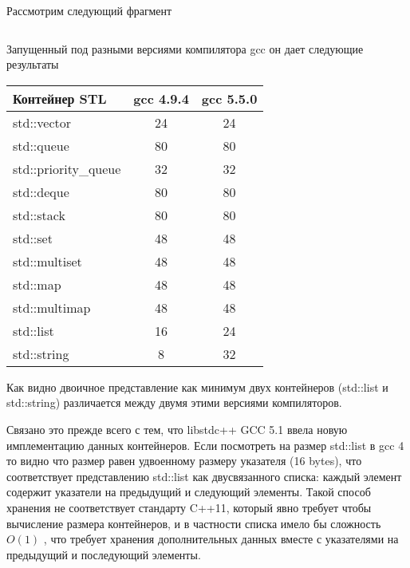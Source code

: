 \documentclass[14pt,a4paper]{article}
\begin{document}
Рассмотрим следующий фрагмент
\inputminted{c++}{./src/sizes.cpp}

Запущенный под разными версиями компилятора gcc он дает следующие
результаты 
\begin{longtable}{|l|c|c|}
\hline
Контейнер STL & gcc 4.9.4 & gcc 5.5.0 \\
\hline
std::vector & 24 & 24 \\
std::queue & 80 & 80 \\
std::priority\_queue & 32 & 32 \\
std::deque & 80 & 80 \\
std::stack & 80 & 80 \\
std::set & 48 & 48 \\
std::multiset & 48 & 48 \\
std::map & 48 & 48 \\
std::multimap & 48 & 48 \\
std::list & 16 & 24 \\
std::string & 8 & 32 \\
\hline
\end{longtable}

Как видно двоичное представление как минимум двух контейнеров
(std::list и std::string) различается между двумя этими версиями
компиляторов.

Связано это прежде всего с тем, что libstdc++ GCC 5.1 ввела
\cite{DualABI}  новую имплементацию данных контейнеров. Если
посмотреть на размер std::list в gcc 4 то видно что размер равен
удвоенному размеру
указателя (16 bytes), что соответствует представлению std::list как
двусвязанного списка: каждый элемент содержит указатели на предыдущий
и следующий элементы. Такой способ хранения не соответствует стандарту
C++11, который явно требует чтобы вычисление размера контейнеров, и
в частности списка имело бы сложность $O(1)$ \cite{ISO:2012:III}, что требует хранения
дополнительных данных вместе с указателями на предыдущий и последующий
элементы.   




\end{document}
